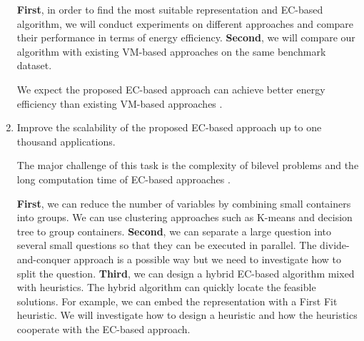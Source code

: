 \begin{enumerate}


	 \textbf{First}, in order to find the most suitable representation and EC-based algorithm, we will conduct experiments on different approaches and compare their performance in terms of energy efficiency. \textbf{Second}, we will compare our algorithm with existing VM-based approaches on the same benchmark dataset. 

	 We expect the proposed EC-based approach can achieve better energy efficiency than existing VM-based approaches \cite{Wilcox:2011ea, Xu:2010vh}.

	\item Improve the scalability of the proposed EC-based approach up to one thousand applications.

	The major challenge of this task is the complexity of bilevel problems and the long computation time of EC-based approaches \cite{Sinha:2017et}. 

	 \textbf{First}, we can reduce the number of variables by combining small containers
	into groups. We can use clustering approaches such as K-means \cite{Xie:2011fj} and decision tree to group containers. \textbf{Second}, we can separate a large question into several small questions so that they can be executed in parallel. The divide-and-conquer approach is a possible way but we need to investigate how to split the question. \textbf{Third}, we can design a hybrid EC-based algorithm mixed with heuristics. The hybrid algorithm can quickly locate the feasible solutions. For example, we can embed the representation with a First Fit heuristic. We will investigate how to design a heuristic and how the heuristics cooperate with the EC-based approach.


\end{enumerate}
